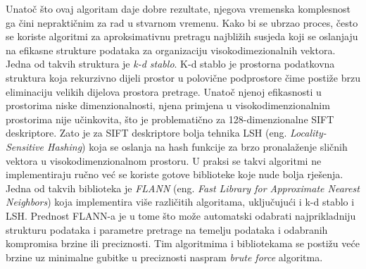 Unatoč što ovaj algoritam daje dobre rezultate, njegova vremenska komplesnost ga čini nepraktičnim za rad u stvarnom vremenu. Kako bi se ubrzao proces, često se koriste algoritmi za aproksimativnu pretragu najbližih susjeda koji se oslanjaju na efikasne strukture podataka za organizaciju visokodimezionalnih vektora. Jedna od takvih struktura je \textit{k-d stablo}. K-d stablo je prostorna podatkovna struktura koja rekurzivno dijeli prostor u polovične podprostore čime postiže brzu eliminaciju velikih dijelova prostora pretrage. Unatoč njenoj efikasnosti u prostorima niske dimenzionalnosti, njena primjena u visokodimenzionalnim prostorima nije učinkovita, što je problematično za 128-dimenzionalne SIFT deskriptore. Zato je za SIFT deskriptore bolja tehnika LSH (eng. \textit{Locality-Sensitive Hashing}) koja se oslanja na hash funkcije za brzo pronalaženje sličnih vektora u visokodimenzionalnom prostoru.
U praksi se takvi algoritmi ne implementiraju ručno već se koriste gotove biblioteke koje nude bolja rješenja. Jedna od takvih biblioteka je \textit{FLANN} (eng. \textit{Fast Library for Approximate Nearest Neighbors}) koja implementira više različitih algoritama, uključujući i k-d stablo i LSH. Prednost FLANN-a je u tome što može automatski odabrati najprikladniju strukturu podataka i parametre pretrage na temelju podataka i odabranih kompromisa brzine ili preciznosti. Tim algoritmima i bibliotekama se postižu veće brzine uz minimalne gubitke u preciznosti naspram \textit{brute force} algoritma.